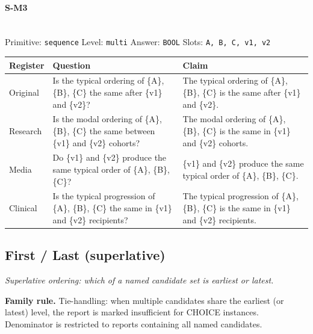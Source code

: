 \documentclass[11pt]{article}
\begin{document}
\paragraph{\textbf{S-M3}}\mbox{}\\
Primitive: \texttt{sequence} \quad Level: \texttt{multi} \quad Answer: \texttt{BOOL} \quad Slots: \texttt{A, B, C, v1, v2}\\[2pt]
\begin{tabularx}{\linewidth}{@{}l L L@{}}
\toprule
\textbf{Register} & \textbf{Question} & \textbf{Claim} \\
\midrule
Original & Is the typical ordering of \{A\}, \{B\}, \{C\} the same after \{v1\} and \{v2\}? & The typical ordering of \{A\}, \{B\}, \{C\} is the same after \{v1\} and \{v2\}. \\
Research & Is the modal ordering of \{A\}, \{B\}, \{C\} the same between \{v1\} and \{v2\} cohorts? & The modal ordering of \{A\}, \{B\}, \{C\} is the same in \{v1\} and \{v2\} cohorts. \\
Media & Do \{v1\} and \{v2\} produce the same typical order of \{A\}, \{B\}, \{C\}? & \{v1\} and \{v2\} produce the same typical order of \{A\}, \{B\}, \{C\}. \\
Clinical & Is the typical progression of \{A\}, \{B\}, \{C\} the same in \{v1\} and \{v2\} recipients? & The typical progression of \{A\}, \{B\}, \{C\} is the same in \{v1\} and \{v2\} recipients. \\
\bottomrule
\end{tabularx}
\vspace{4pt}

\subsection{First / Last (superlative)}
\noindent\emph{Superlative ordering: which of a named candidate set is earliest or latest.}

\noindent\textbf{Family rule.} Tie-handling: when multiple candidates share the earliest (or latest) level, the report is marked insufficient for CHOICE instances. Denominator is restricted to reports containing all named candidates.
\end{document}
